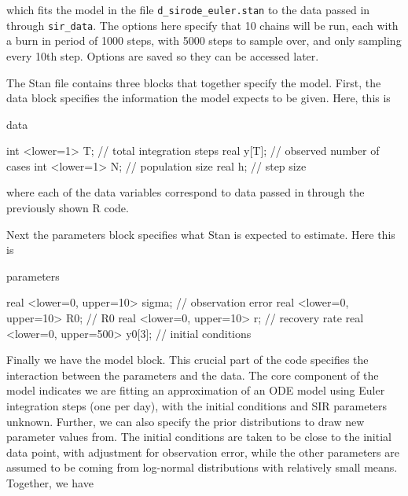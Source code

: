 \documentclass[12pt]{article}
\begin{document}
    which fits the model in the file \verb|d_sirode_euler.stan| to the data passed in through \verb|sir_data|. The options here specify that 10 chains will be run, each with a burn in period of 1000 steps, with 5000 steps to sample over, and only sampling every 10th step. Options are saved so they can be accessed later.

    The Stan file contains three blocks that together specify the model. First, the data block specifies the information the model expects to be given. Here, this is

    \begin{Stan}
    data {

        int     <lower=1>   T;      // total integration steps
        real                y[T];   // observed number of cases
        int     <lower=1>   N;      // population size
        real                h;      // step size

    }
    \end{Stan}

    where each of the data variables correspond to data passed in through the previously shown R code.

    Next the parameters block specifies what Stan is expected to estimate. Here this is

    \begin{Stan}
    parameters {

        real <lower=0, upper=10>    sigma;  // observation error
        real <lower=0, upper=10>    R0;     // R0
        real <lower=0, upper=10>    r;      // recovery rate
        real <lower=0, upper=500>   y0[3];  // initial conditions

    }
    \end{Stan}

    Finally we have the model block. This crucial part of the code specifies the interaction between the parameters and the data. The core component of the model indicates we are fitting an approximation of an ODE model using Euler integration steps (one per day), with the initial conditions and SIR parameters unknown. Further, we can also specify the prior distributions to draw new parameter values from. The initial conditions are taken to be close to the initial data point, with adjustment for observation error, while the other parameters are assumed to be coming from log-normal distributions with relatively small means. Together, we have
\end{document}
